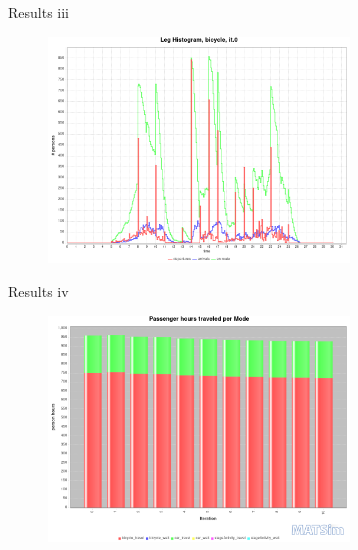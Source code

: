 \documentclass[10pt, aspectratio=169]{beamer}
\begin{document}
    \begin{frame}{Results iii}
        \begin{center}
            \begin{figure}
                \centering
                \includegraphics[height=6cm]{images/build_city/results/0.legHistogram_slow_bicycle.png}
            \end{figure}
        \end{center}
    \end{frame}
    
    \begin{frame}{Results iv}
        \begin{center}
            \begin{figure}
                \centering
                \includegraphics[height=6cm, keepaspectratio]{images/build_city/results/ph_modestats.png}
            \end{figure}
        \end{center}
    \end{frame}
    
\end{document}
